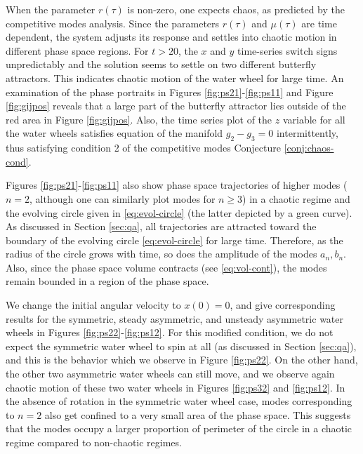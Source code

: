 When the parameter $r(\tau)$ is non-zero, one expects chaos, as predicted by the competitive modes analysis. Since the parameters $r(\tau)$ and $\mu(\tau)$ are time dependent, the system adjusts its response and settles into chaotic motion in different phase space regions. For $t>20$, the $x$ and $y$ time-series switch signs unpredictably and the solution seems to settle on two different butterfly attractors. This indicates chaotic motion of the water wheel for large time. An examination of the phase portraits in Figures \ref{fig:ps21}-\ref{fig:ps11} and Figure \ref{fig:gijpos} reveals that a large part of the butterfly attractor lies outside of the red area in Figure \ref{fig:gijpos}. Also, the time series plot of the $z$ variable for all the water wheels satisfies equation of the manifold $g_2-g_3=0$ intermittently, thus satisfying condition 2 of the competitive modes Conjecture \ref{conj:chaos-cond}.

Figures \ref{fig:ps21}-\ref{fig:ps11} also show phase space trajectories of higher modes ($n=2$, although one can similarly plot modes for $n\geq 3$) in a chaotic regime and the evolving circle given in \eqref{eq:evol-circle} (the latter depicted by a green curve). As discussed in Section \ref{sec:qa}, all trajectories are attracted toward the boundary of the evolving circle \eqref{eq:evol-circle} for large time. Therefore, as the radius of the circle grows with time, so does the amplitude of the modes $a_n, b_n$. Also, since the phase space volume contracts (see \eqref{eq:vol-cont}), the modes remain bounded in a region of the phase space. 

We change the initial angular velocity to $x(0) =0$, and give corresponding results for the symmetric, steady asymmetric, and unsteady asymmetric water wheels in Figures \ref{fig:ps22}-\ref{fig:ps12}. For this modified condition, we do not expect the symmetric water wheel to spin at all (as discussed in Section \ref{sec:qa}), and this is the behavior which we observe in Figure \ref{fig:ps22}. On the other hand, the other two asymmetric water wheels can still move, and we observe again chaotic motion of these two water wheels in Figures \ref{fig:ps32} and \ref{fig:ps12}. In the absence of rotation in the symmetric water wheel case, modes corresponding to $n=2$ also get confined to a very small area of the phase space. This suggests that the modes occupy a larger proportion of perimeter of the circle in a chaotic regime compared to non-chaotic regimes.




